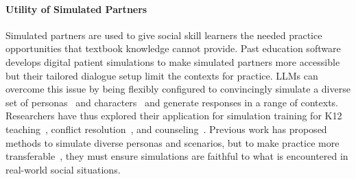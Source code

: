 \documentclass[11pt]{article}
\begin{document}
\paragraph{Utility of Simulated Partners}
Simulated partners are used to give social skill learners the needed practice opportunities that textbook knowledge cannot provide. %
Past education software develops digital patient simulations to make simulated partners more accessible~\cite{othlinghaus2020seriousroleplaying} but their tailored dialogue setup %
limit the contexts for practice. LLMs can overcome this issue by being flexibly configured to convincingly simulate a diverse set of personas~\cite{park2022social} and characters~\cite{park2023generative} and generate responses in a range of contexts. Researchers have thus explored their application for simulation training for K12 teaching~\cite{markel_opferman_landay_piech_2023}, conflict resolution~\cite{rehearsal}, and counseling~\cite{demasi-etal-2020-multi,tanana2019development, chen2023llmempowered}. 
Previous work has proposed methods to simulate diverse personas and scenarios, but to make practice more  transferable~\cite{alinier2022simulation}, they must ensure simulations are faithful to what is encountered in real-world social situations.
\end{document}
